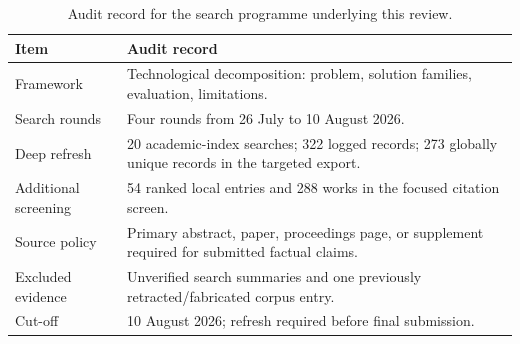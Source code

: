 \begin{table}[htbp]
\centering
\small
\caption{Audit record for the search programme underlying this review.}
\label{tab:audit}
\begin{tabularx}{\textwidth}{L{3.0cm}Y}
\toprule
\textbf{Item} & \textbf{Audit record} \\
\midrule
Framework & Technological decomposition: problem, solution families, evaluation, limitations. \\
Search rounds & Four rounds from 26 July to 10 August 2026. \\
Deep refresh & 20 academic-index searches; 322 logged records; 273 globally unique records in the targeted export. \\
Additional screening & 54 ranked local entries and 288 works in the focused citation screen. \\
Source policy & Primary abstract, paper, proceedings page, or supplement required for submitted factual claims. \\
Excluded evidence & Unverified search summaries and one previously retracted/fabricated corpus entry. \\
Cut-off & 10 August 2026; refresh required before final submission. \\
\bottomrule
\end{tabularx}
\end{table}

